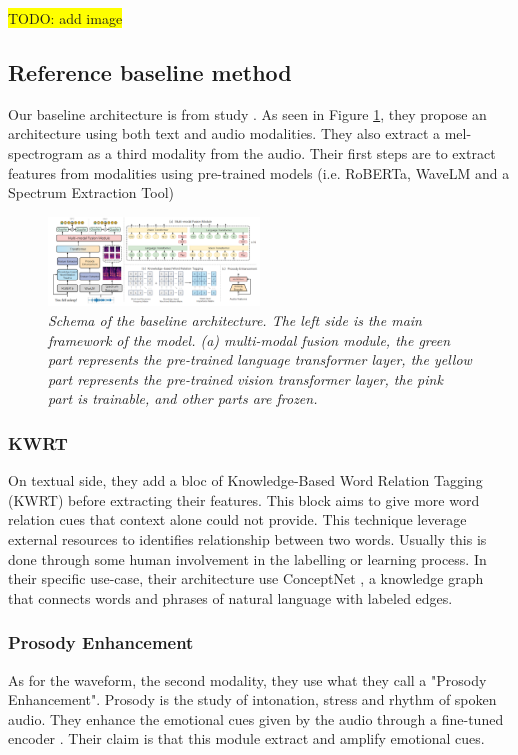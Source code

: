 \documentclass{article}
\begin{document}
\colorbox{yellow}{TODO: add image}\\

\subsection{Reference baseline method}

Our baseline architecture is from study \cite{ERCFusionModel}.
As seen in Figure \ref{fig:BaselineArchitecture}, they propose an architecture using both text and audio modalities. They also extract a mel-spectrogram as a third modality from the audio. Their first steps are to extract features from modalities using pre-trained models (i.e. RoBERTa, WaveLM and a Spectrum Extraction Tool)

\begin{figure}[htbp]
  \centering
  \includegraphics[width=0.5\textwidth]{Images/EPCFusion_BaselineArchitecture.png}
  \caption{\textit{Schema of the baseline architecture. The left side is the main framework of the model. (a) multi-modal fusion module, the green part represents the pre-trained
language transformer layer, the yellow part represents the pre-trained vision transformer layer, the pink part is trainable, and other
parts are frozen.}}
  \label{fig:BaselineArchitecture}
\end{figure}

\subsubsection{KWRT}
On textual side, they add a bloc of Knowledge-Based Word Relation Tagging (KWRT) before extracting their features. This block aims to give more word relation cues that context alone could not provide. This technique leverage external resources to identifies relationship between two words. Usually this is done through some human involvement in the labelling or learning process. In their specific use-case, their architecture use ConceptNet \cite{speer2018conceptnet}, a knowledge graph that connects words and phrases of natural language with labeled edges.

\subsubsection{Prosody Enhancement}
As for the waveform, the second modality, they use what they call a "Prosody Enhancement". Prosody is the study of intonation, stress and rhythm of spoken audio. They enhance the emotional cues given by the audio through a fine-tuned encoder \cite{yang2022speech}. Their claim is that this module extract and amplify emotional cues.
\end{document}
